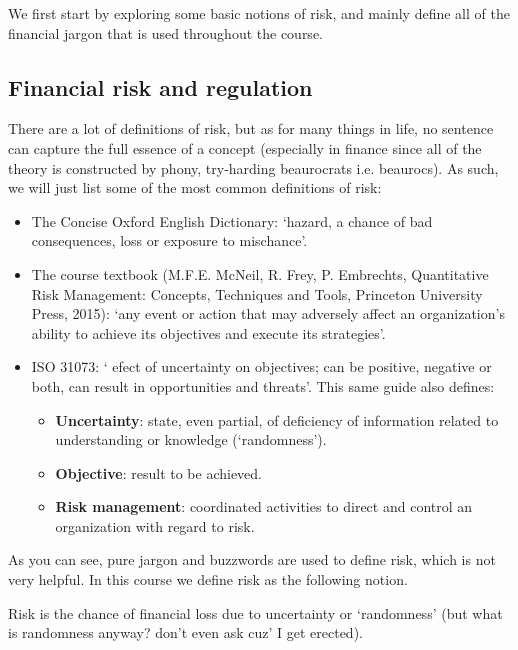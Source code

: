 We first start by exploring some basic notions of risk, and mainly define all of the financial jargon that is used throughout the course.

\subsection*{Financial risk and regulation}
There are a lot of definitions of risk, but as for many things in life, no sentence can capture the full essence of a concept (especially in finance since all of the theory is constructed by phony, try-harding beaurocrats i.e. beaurocs).
As such, we will just list some of the most common definitions of risk:

\vspace{0.2cm}

\begin{itemize}
    \item The Concise Oxford English Dictionary: `hazard, a chance of bad consequences, loss or exposure to mischance'.
    \item The course textbook (M.F.E. McNeil, R. Frey, P. Embrechts, Quantitative Risk Management: Concepts, Techniques and Tools, Princeton University Press, 2015): `any event or action that may adversely affect an organization's ability to achieve 
    its objectives and execute its strategies'.
    \item ISO 31073: ` efect of uncertainty on objectives; can be positive, negative or both, can result in opportunities and threats'. This same guide also defines: 
    \begin{itemize}
        \item \textbf{Uncertainty}: state, even partial, of deficiency of information related to understanding or knowledge (`randomness').
        \item \textbf{Objective}: result to be achieved.
        \item \textbf{Risk management}: coordinated activities to direct and control an organization with regard to risk.
    \end{itemize}
\end{itemize}

\vspace{0.2cm}

As you can see, pure jargon and buzzwords are used to define risk, which is not very helpful. In this course we define risk as the following notion.

\begin{definition}
    Risk is the chance of financial loss due to uncertainty or `randomness' (but what is randomness anyway? don't even ask cuz' I get erected).
\end{definition}


